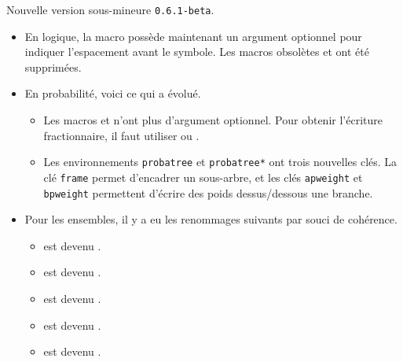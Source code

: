 Nouvelle version sous-mineure \verb+0.6.1-beta+.

\begin{itemize}[itemsep=.5em]
    \item En logique, la macro  possède maintenant un argument optionnel pour indiquer l'espacement avant le symbole. Les macros obsolètes  et  ont été supprimées.


    \item En probabilité, voici ce qui a évolué.
    \begin{itemize}[itemsep=.5em]
        \item Les macros  et  n'ont plus d'argument optionnel. Pour obtenir l'écriture fractionnaire, il faut utiliser  ou .

        \item Les environnements \verb+probatree+ et \verb+probatree*+ ont trois nouvelles clés.
              La clé \verb+frame+ permet d'encadrer un sous-arbre, et les clés \verb+apweight+ et \verb+bpweight+ permettent d'écrire des poids dessus/dessous une branche.
    \end{itemize}


    \item Pour les ensembles, il y a eu les renommages suivants par souci de cohérence.
    \begin{itemize}[itemsep=.5em]
        \item {} est devenu .

        \item {} est devenu .

        \item {} est devenu .

        \item {} est devenu .

        \item {} est devenu .
    \end{itemize}
\end{itemize}
